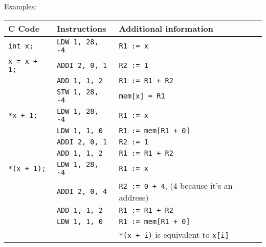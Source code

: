 \par{
    \noindent
    \underline{Examples:}
    \par{
        \noindent
        \begin{tabular}{lll}
            \hline
            C Code                  &   Instructions                &    Additional information                         			\\
            \hline
            \hline
            \rowcolor{blue!25}                
            \texttt{int x;}         &   \texttt{LDW 1, 28, -4}      &   \texttt{R1 := x}                               				\\
            \rowcolor{blue!25}
            \texttt{x = x + 1;}		&   \texttt{ADDI 2, 0, 1}       &   \texttt{R2 := 1}                                            \\
            \rowcolor{blue!25}
                                    &   \texttt{ADD 1, 1, 2}        &   \texttt{R1 := R1 + R2}                                    	\\
			\rowcolor{blue!25}
                                    &   \texttt{STW 1, 28, -4}      &   \texttt{mem[x] = R1}                                       	\\
            \rowcolor{green!25}
            \texttt{*x + 1;}        &   \texttt{LDW 1, 28, -4}      &   \texttt{R1 := x}                             				\\
            \rowcolor{green!25}
                                    &   \texttt{LDW 1, 1, 0}       	&   \texttt{R1 := mem[R1 + 0]}                               	\\
			\rowcolor{green!25}
                                    &   \texttt{ADDI 2, 0, 1}       &   \texttt{R2 := 1}                                        	\\
			\rowcolor{green!25}
                                    &   \texttt{ADD 1, 1, 2}       	&	\texttt{R1 := R1 + R2}                   					\\
            \rowcolor{red!25}
            \texttt{*(x + 1);}     	&   \texttt{LDW 1, 28, -4}      &   \texttt{R1 := x}                                			\\
            \rowcolor{red!25}
                                    &   \texttt{ADDI 2, 0, 4} 		&   \texttt{R2 := 0 + 4}, (4 because it's an address)			\\   
			\rowcolor{red!25}
                                    &   \texttt{ADD 1, 1, 2} 		&   \texttt{R1 := R1 + R2}										\\
			\rowcolor{red!25}
                                    &   \texttt{LDW 1, 1, 0} 		&   \texttt{R1 := mem[R1 + 0]}           						\\
			\rowcolor{red!25}
									&								&	\texttt{*(x + i)} is equivalent to \texttt{x[i]}			\\
            \hline
        \end{tabular}
    }    
}


